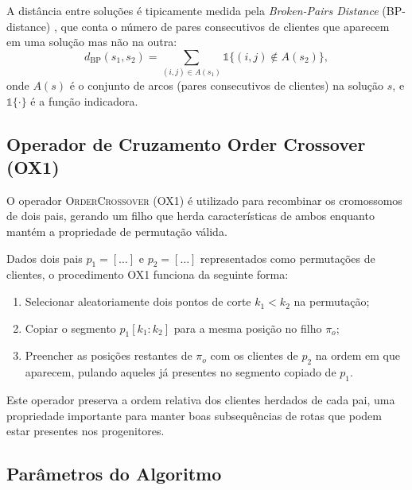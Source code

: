 A distância entre soluções é tipicamente medida pela \emph{Broken-Pairs Distance} (BP-distance) \cite{sorensen2006distance}, que conta o número de pares consecutivos de clientes que aparecem em uma solução mas não na outra:
\begin{equation}
    d_{\text{BP}}(s_1, s_2) = \sum_{(i,j) \in A(s_1)} \mathbb{1}\{(i,j) \notin A(s_2)\},
    \label{eq:bp_distance}
\end{equation}
onde $A(s)$ é o conjunto de arcos (pares consecutivos de clientes) na solução $s$, e $\mathbb{1}\{\cdot\}$ é a função indicadora.

\subsection{Operador de Cruzamento Order Crossover (OX1)}

O operador \textsc{OrderCrossover} (OX1) \cite{davis1985applying} é utilizado para recombinar os cromossomos de dois pais, gerando um filho que herda características de ambos enquanto mantém a propriedade de permutação válida.

Dados dois pais $p_1 = [\ldots]$ e $p_2 = [\ldots]$ representados como permutações de clientes, o procedimento OX1 funciona da seguinte forma:
\begin{enumerate}
    \item Selecionar aleatoriamente dois pontos de corte $k_1 < k_2$ na permutação;
    \item Copiar o segmento $p_1[k_1:k_2]$ para a mesma posição no filho $\pi_o$;
    \item Preencher as posições restantes de $\pi_o$ com os clientes de $p_2$ na ordem em que aparecem, pulando aqueles já presentes no segmento copiado de $p_1$.
\end{enumerate}

Este operador preserva a ordem relativa dos clientes herdados de cada pai, uma propriedade importante para manter boas subsequências de rotas que podem estar presentes nos progenitores.

\subsection{Parâmetros do Algoritmo}

